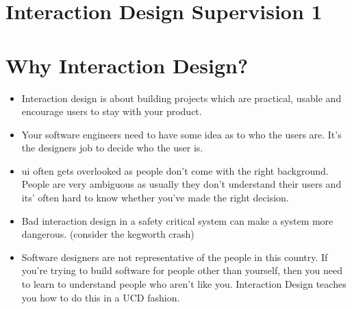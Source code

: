 \documentclass[10pt, a4paper]{article}
\begin{document}
\section*{Interaction Design Supervision 1}

\section{Why Interaction Design?}

\begin{itemize}

\item Interaction design is about building projects which are practical, usable and encourage users to stay with your
product.

\item Your software engineers need to have some idea as to who the users are. It's the designers job to decide who
the user is.

\item ui often gets overlooked as people don't come with the right background. People are very ambiguous as usually
they don't understand their users and its' often hard to know whether you've made the right decision.

\item Bad interaction design in a safety critical system can make a system more dangerous. (consider the kegworth crash)

\item Software designers are not representative of the people in this country. If you're trying to build software for
people other than yourself, then you need to learn to understand people who aren't like you. Interaction Design
teaches you how to do this in a UCD fashion.

\end{itemize}

\section{}
\end{document}
